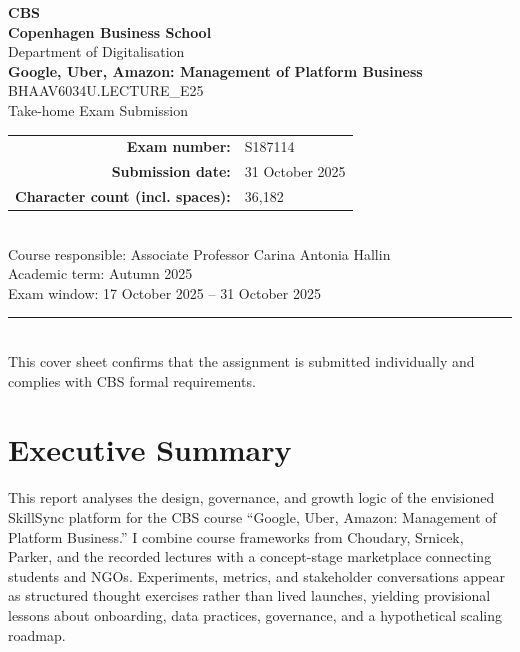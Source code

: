 \documentclass[12pt,a4paper]{article}
\newcommand{\university}{Copenhagen Business School}
\newcommand{\faculty}{Department of Digitalisation}
\newcommand{\examTitle}{Google, Uber, Amazon: Management of Platform Business}
\newcommand{\examCode}{BHAAV6034U.LECTURE\_E25}
\newcommand{\examType}{Take-home Exam Submission}
\newcommand{\studentId}{S187114}
\newcommand{\submissionDate}{31 October 2025}
\newcommand{\wordCount}{36,182}
\begin{document}
\begin{titlepage}
  \thispagestyle{empty}
  \centering
  {\Large \textcolor{gray!70}{\textbf{CBS}}}\\[1cm]
  {\Large \textbf{\university}}\\[0.5cm]
  {\large \faculty}\\[1.5cm]
  {\LARGE \textbf{\examTitle}}\\[0.5cm]
  {\large \examCode\\\examType}\\[1.5cm]
  \begin{tabular}{rl}
    \textbf{Exam number:} & \studentId \\
    \textbf{Submission date:} & \submissionDate \\
    \textbf{Character count (incl. spaces):} & \wordCount \\
  \end{tabular}\\[1.5cm]
  \vfill
  {\large Course responsible: Associate Professor Carina Antonia Hallin}\\[0.3cm]
  {\large Academic term: Autumn 2025}\\[0.3cm]
  {\large Exam window: 17 October 2025 -- 31 October 2025}\\[1.5cm]
  \rule{0.8\linewidth}{0.4pt}\\[0.5cm]
  {\small This cover sheet confirms that the assignment is submitted individually and complies with CBS formal requirements.}
\end{titlepage}

\pagestyle{fancy}
\fancyhf{}
\fancyfoot[C]{\thepage}
\renewcommand{\headrulewidth}{0pt}
\renewcommand{\footrulewidth}{0pt}

\setcounter{secnumdepth}{-1}
\makeatletter
\renewcommand{\numberline}[1]{}
\makeatother

\section*{Executive Summary}
This report analyses the design, governance, and growth logic of the envisioned SkillSync platform for the CBS course ``Google, Uber, Amazon: Management of Platform Business.'' I combine course frameworks from Choudary, Srnicek, Parker, and the recorded lectures with a concept-stage marketplace connecting students and NGOs. Experiments, metrics, and stakeholder conversations appear as structured thought exercises rather than lived launches, yielding provisional lessons about onboarding, data practices, governance, and a hypothetical scaling roadmap.
\end{document}
